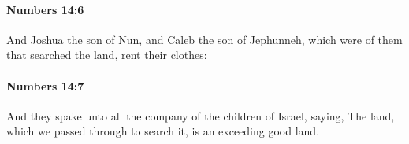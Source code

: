 		\paragraph{Numbers 14:6} %
			\label{NUMBERS-14-6}

			And Joshua the son of Nun, and Caleb the son of Jephunneh, which were of them that searched the land, rent their clothes:


		\paragraph{Numbers 14:7} %
			\label{NUMBERS-14-7}

			And they spake unto all the company of the children of Israel, saying, The land, which we passed through to search it, is an exceeding good land.


